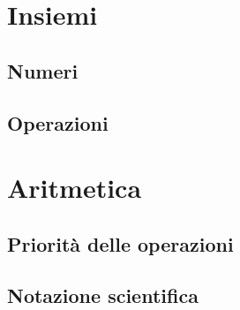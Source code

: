 \documentclass[
finale,
ssectnum,
]{DossierExMathIta}
\author{CPT}
\date{2020}
\begin{document}
\setlength{\columnsep}{0.6cm}
\indice


\section{Insiemi}
\subsection{Numeri}
\begin{questions}
	
\end{questions}


\subsection{Operazioni}
\begin{questions}
	
\end{questions}

\exnewpage

\section{Aritmetica}
\subsection{Priorità delle operazioni}
\begin{questions}
	
\end{questions}

\subsection{Notazione scientifica}
\begin{questions}
	
\end{questions}
\end{document}
